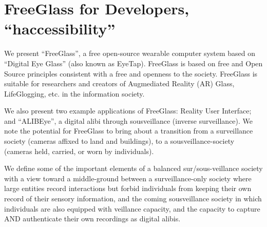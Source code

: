 \chapter{FreeGlass for Developers, ``haccessibility''}
\label{freeglassdevelopers}
We present ``FreeGlass'', a free open-source wearable computer system based on ``Digital Eye Glass'' (also known as EyeTap). FreeGlass is based on free and Open Source principles consistent with a free and openness to the society. FreeGlass is suitable for researchers and creators of Augmediated Reality (AR) Glass, LifeGlogging, etc. in the information society.

We also present two example applications of FreeGlass: Reality User Interface;
and ``ALIBEye'', a digital alibi through sousveillance (inverse surveillance).
We note the potential for FreeGlass to bring about a transition from a surveillance society
(cameras affixed to land and buildings), to a sousveillance-society (cameras held, carried, or worn by individuals).

We define some of the important elements of a balanced sur/sous-veillance society with a view toward a middle-ground between a surveillance-only society where large entities record interactions but forbid individuals from
keeping their own record of their sensory information, and the coming sousveillance society in which individuals are also equipped with veillance capacity, and the capacity to capture AND authenticate their own recordings as
digital alibis.

